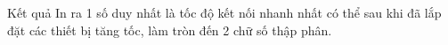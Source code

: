 Kết quả  
In ra 1 số duy nhất là tốc độ kết nối nhanh nhất có thể sau khi đã lắp đặt các thiết bị tăng tốc, làm tròn đến 2 chữ số thập phân.